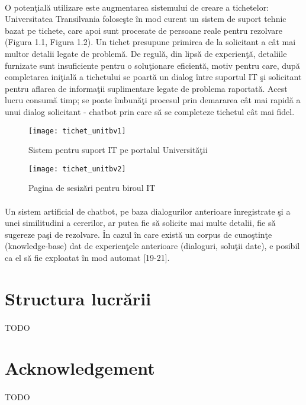 \paragraph{}
O poten\c tial\u a utilizare este augmentarea sistemului de creare a tichetelor: Universitatea Transilvania folose\c ste \^ in mod curent un sistem de suport tehnic bazat pe tichete, care apoi sunt procesate de persoane reale pentru rezolvare (Figura 1.1, Figura 1.2). Un tichet presupune primirea de la solicitant a c\^ at mai multor detalii legate de problem\u a. De regul\u a, din lips\u a de experien\c t\u a, detaliile furnizate sunt insuficiente pentru o solu\c tionare eficient\u a, motiv pentru care, dup\u a completarea ini\c tial\u a a tichetului se poart\u a un dialog \^ intre suportul IT \c si solicitant pentru aflarea de informa\c tii suplimentare legate de problema raportat\u a. Acest lucru consum\u a timp; se poate \^ imbun\u a\c ti procesul prin demararea c\^ at mai rapid\u a a unui dialog solicitant - chatbot prin care s\u a se completeze tichetul c\^ at mai fidel.

\begin{figure}[H]
\centering
\texttt{[image: tichet\_unitbv1]}
\caption{Sistem pentru suport IT pe portalul Universit\u a\c tii}
\end{figure}

\begin{figure}[H]
\centering
\texttt{[image: tichet\_unitbv2]}
\caption{Pagina de sesiz\u ari pentru biroul IT}
\end{figure}

\paragraph{}
Un sistem artificial de chatbot, pe baza dialogurilor anterioare \^ inregistrate \c si a unei similitudini a cererilor, ar putea fie s\u a solicite mai multe detalii, fie s\u a sugereze pa\c si de rezolvare. \^ In cazul \^ in care exist\u a un corpus de cuno\c stin\c te (knowledge-base) dat de experien\c tele anterioare (dialoguri, solu\c tii date), e posibil ca el s\u a fie exploatat \^ in mod automat [19-21].

\section{Structura lucr\u arii}

\paragraph{}
TODO


\section{Acknowledgement}

\paragraph{}
TODO